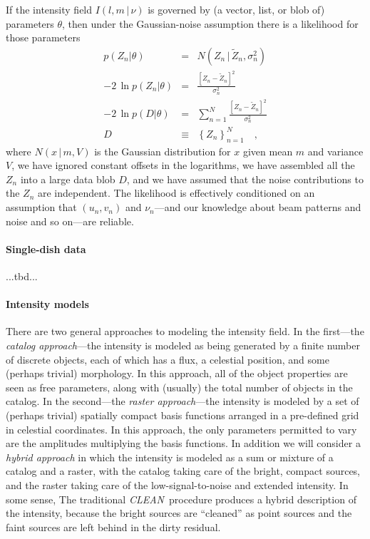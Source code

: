 \documentclass[12pt]{article}
\newcommand{\project}[1]{\textsl{#1}}
\newcommand{\CLEAN}{\project{CLEAN}}
\newcommand{\set}[1]{\left\{{#1}\right\}}
\newcommand{\given}{\,|\,}
\newcommand{\expectation}[1]{\tilde{#1}}
\newcommand{\normal}{N}
\begin{document}
If the intensity field $I(l,m\given\nu)$ is governed by (a vector,
list, or blob of) parameters $\theta$, then under the Gaussian-noise
assumption there is a likelihood for those parameters
\begin{eqnarray}
p(Z_n|\theta) &=& \normal(Z_n\given\expectation{Z}_n,\sigma_n^2)
\\
-2\,\ln p(Z_n|\theta) &=& \frac{[Z_n - \expectation{Z}_n]^2}{\sigma_n^2}
\\
-2\,\ln p(D|\theta) &=& \sum_{n=1}^N \frac{[Z_n - \expectation{Z}_n]^2}{\sigma_n^2}
\\
D &\equiv& \set{Z_n}_{n=1}^N
\quad ,
\end{eqnarray}
where $\normal(x\given m,V)$ is the Gaussian distribution for $x$
given mean $m$ and variance $V$, we have ignored constant offsets in
the logarithms, we have assembled all the $Z_n$ into a large data blob
$D$, and we have assumed that the noise contributions to the $Z_n$ are
independent.  The likelihood is effectively conditioned on an
assumption that $(u_n, v_n)$ and $\nu_n$---and our knowledge about
beam patterns and noise and so on---are reliable.

\paragraph{Single-dish data}

...tbd...

\paragraph{Intensity models}

There are two general approaches to modeling the intensity field.  In
the first---the \emph{catalog approach}---the intensity is modeled as
being generated by a finite number of discrete objects, each of which
has a flux, a celestial position, and some (perhaps trivial)
morphology.  In this approach, all of the object properties are seen
as free parameters, along with (usually) the total number of objects
in the catalog.  In the second---the \emph{raster approach}---the
intensity is modeled by a set of (perhaps trivial) spatially compact
basis functions arranged in a pre-defined grid in celestial
coordinates.  In this approach, the only parameters permitted to vary
are the amplitudes multiplying the basis functions.  In addition we
will consider a \emph{hybrid approach} in which the intensity is
modeled as a sum or mixture of a catalog and a raster, with the
catalog taking care of the bright, compact sources, and the raster
taking care of the low-signal-to-noise and extended intensity.  In
some sense, The traditional \CLEAN\ procedure produces a hybrid
description of the intensity, because the bright sources are
``cleaned'' as point sources and the faint sources are left behind in
the dirty residual.
\end{document}

